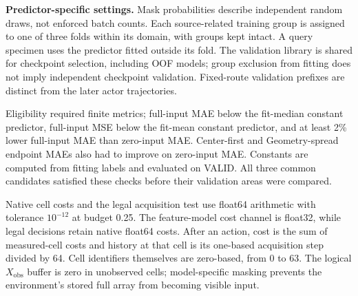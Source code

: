\documentclass[11pt,a4paper]{article}
\begin{document}
\textbf{Predictor-specific settings.} Mask probabilities describe independent random draws, not enforced batch counts. Each source-related training group is assigned to one of three folds within its domain, with groups kept intact. A query specimen uses the predictor fitted outside its fold. The validation library is shared for checkpoint selection, including OOF models; group exclusion from fitting does not imply independent checkpoint validation. Fixed-route validation prefixes are distinct from the later actor trajectories.

Eligibility required finite metrics; full-input MAE below the fit-median constant predictor, full-input MSE below the fit-mean constant predictor, and at least 2\% lower full-input MAE than zero-input MAE. Center-first and Geometry-spread endpoint MAEs also had to improve on zero-input MAE. Constants are computed from fitting labels and evaluated on VALID. All three common candidates satisfied these checks before their validation areas were compared.

Native cell costs and the legal acquisition test use float64 arithmetic with tolerance \(10^{-12}\) at budget 0.25. The feature-model cost channel is float32, while legal decisions retain native float64 costs. After an action, cost is the sum of measured-cell costs and history at that cell is its one-based acquisition step divided by 64. Cell identifiers themselves are zero-based, from 0 to 63. The logical \(X_{\mathrm{obs}}\) buffer is zero in unobserved cells; model-specific masking prevents the environment's stored full array from becoming visible input.
\end{document}
